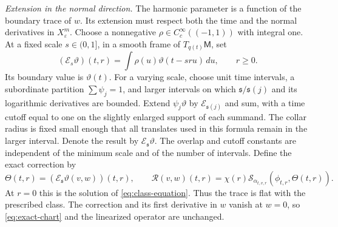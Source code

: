 \documentclass[11pt]{amsart}
\theoremstyle{definition}
\theoremstyle{remark}
\theoremstyle{plain}
\numberwithin{equation}{section}
\newcommand{\Msf}{\mathsf{M}}
\newcommand{\eps}{\varepsilon}
\begin{document}
\emph{Extension in the normal direction.} The harmonic parameter is a
function of the boundary trace of $w$. Its extension must respect
both the time and the normal derivatives in $X^m_\eps$.
Choose a nonnegative $\rho\in C^\infty_c((-1,1))$ with integral one.
At a fixed scale $s\in(0,1]$, in a smooth frame of $T_{q(t)}\Msf$, set
\[
(\mathcal E_s\vartheta)(t,r)
 =\int\rho(u)\vartheta(t-sru)\,du,\qquad r\ge0.
\]
Its boundary value is $\vartheta(t)$. For a varying scale, choose
unit time intervals, a subordinate partition $\sum\psi_j=1$, and
larger intervals on which ${\mathfrak s}/{\mathfrak s}(j)$ and its
logarithmic derivatives are bounded. Extend $\psi_j\vartheta$ by
$\mathcal E_{{\mathfrak s}(j)}$ and sum, with a time cutoff equal to
one on the slightly enlarged support of each summand. The collar
radius is fixed small enough that all translates used in this formula
remain in the larger interval. Denote the result by
$\mathcal E_{\mathfrak s}\vartheta$. The overlap and cutoff constants
are independent of the minimum scale and of the number of intervals.
Define the exact correction by
\begin{equation}\label{eq:trace-extension-chart}
\Theta(t,r)=(\mathcal E_{\mathfrak s}\vartheta(v,w))(t,r),\qquad
\mathcal R(v,w)(t,r)=\chi(r)\mathcal S_{\alpha_{t,v,r}}
                  (\phi_{t,r},\Theta(t,r)).
\end{equation}
At $r=0$ this is the solution of \eqref{eq:class-equation}. Thus the
trace is flat with the prescribed class. The correction and its
first derivative in $w$ vanish at $w=0$, so \eqref{eq:exact-chart}
and the linearized operator are unchanged.
\end{document}
